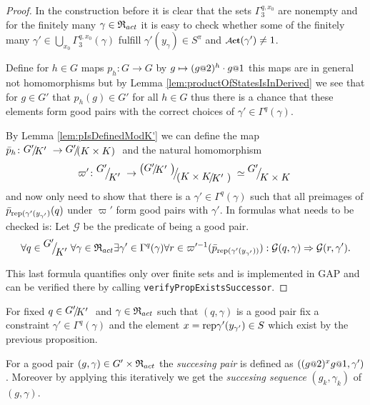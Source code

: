 \documentclass[a4paper,12pt]{article}
\begin{document}
\begin{proof}
 In the construction before it is clear that the sets $\Gamma_3^{q,x_0}$ are nonempty and for the finitely many $\gamma\in \mathfrak{R}_{act}$ it is
 easy to check whether some of the finitely many $\gamma'\in\bigcup_{x_0}\Gamma_3^{q,x_0}(\gamma)$ fulfill $\gamma'(y_\gamma) \in S^\pi$ and $\act(\gamma')\neq 1$.
 
 
  Define for $h\in G$ maps $p_h\colon G\to G$ by $g\mapsto (g\at{2})^{h}\cdot g\at{1}$ this maps are in general not homomorphisms but 
  by Lemma \ref{lem:productOfStatesIsInDerived} we see that for $g\in G'$ that $p_h(g)\in G'$ for all $h\in G$ thus there is a chance that these elements form good pairs with
  the correct choices of $\gamma' \in \Gamma^q(\gamma)$. 
 
  By Lemma \ref{lem:pIsDefinedModK'} we can define the map $\bar p_h\colon \RNK{G'}{K'} \to \RNK{G'}{(K\times K)}$
 and the natural homomorphism \[\varpi'\colon \RNK{G'}{K'} \to \RNK{\left(\RNK{G'}{K'}\right)}{\left(\RNK{K\times K}{K'}\right)} \simeq \RNK{G'}{K\times K} \]
 and now only need to show that there is a $\gamma'\in\Gamma^q(\gamma)$ such that all preimages of $\bar p_{\textup{rep}(\gamma'(y_{\gamma'})}(q)$ under $\varpi'$ 
 form good pairs with $\gamma'$. In formulas what needs to be checked is: Let $\mathcal{G}$ be the predicate of being a good pair. %
 \[\forall q\in\RNK{G'}{K'}
      \forall \gamma\in\Red_{act} 
	 \exists \gamma'\in \Gamma^q(\gamma)
	    \forall r\in \varpi'^{-1}(\bar p_{\textup{rep}(\gamma'(y_{\gamma'}))}):
	      \mathcal{G}(q,\gamma) \Rightarrow \mathcal{G}(r,\gamma').\]
 
 This last formula quantifies only over finite sets and is implemented in GAP and can be verified there by calling \lstinline{verifyPropExistsSuccessor}. 
 \end{proof}

 \begin{defi}
 For fixed $q\in\RNK{G'}{K'}$ and $\gamma\in \mathfrak{R}_{act}$ such that $(q,\gamma)$ is a good pair
 fix a constraint $\gamma'\in\Gamma^q(\gamma)$ and the element $x=\textup{rep}\gamma'(y_{\gamma'})\in S$ which exist by the previous proposition.
 
 For a good pair $(g,\gamma)\in G'\times\mathfrak{R}_{act}$ the \emph{succesing pair} is defined as $\left((g\at{2})^xg\at{1},\gamma'\right)$.
 Moreover by applying this iteratively we get the \emph{succesing sequence} $(g_k,\gamma_k)$ of $(g,\gamma)$.
 \end{defi}
 
\end{document}
